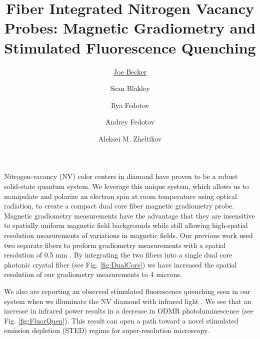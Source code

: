 \documentclass[12 pt]{article}
\begin{document}
\title{\vspace{-1.5cm}\textbf{Fiber Integrated Nitrogen Vacancy Probes: Magnetic Gradiometry and Stimulated Fluorescence Quenching}}

\date{}

\author{\underline{Joe Becker}}
\author{Sean Blakley}
\author[1,2,3]{Ilya Fedotov}
\author[1,2,3]{Andrey Fedotov}
\author[1,2,3]{Aleksei M. Zheltikov}

\begin{small}
\end{small}

\maketitle

\thispagestyle{empty}
\vspace{-1cm}
Nitrogen-vacancy (NV) color centers in diamond have proven to be a robust solid-state quantum system. We leverage 
this unique system, which allows us to manipulate and polarize an electron spin at room temperature using optical 
radiation, to create a compact dual core fiber magnetic gradiometry probe. Magnetic gradiometry measurements have
the advantage that they are insensitive to spatially uniform magnetic field backgrounds 
while still allowing high-spatial resolution measurements of variations in magnetic fields. 
Our previous work used two separate fibers to preform gradiometry measurements with a spatial resolution of 
0.5 mm \cite{Blakley2015}. By integrating the two fibers into a single dual core photonic crystal fiber 
(see Fig. \ref{fig:DualCore}) we have increased the spatial resolution of our gradiometry measurements to 4 microns.

We also are reporting an observed stimulated fluorescence quenching seen in our system when we illuminate the NV
diamond with infrared light \cite{Blakley2016}. We see that an increase in infrared power results in a decrease in
ODMR photoluminescence (see Fig. \ref{fig:FluorQuen}). This result can open a path toward a novel stimulated emission 
depletion (STED) regime for super-resolution microscopy.
\end{document}

